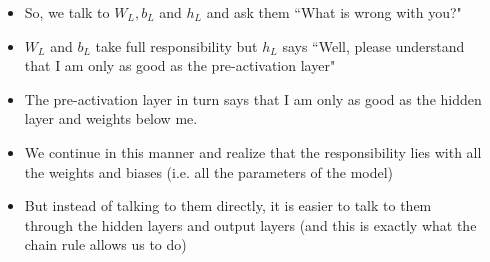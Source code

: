 \begin{frame}
  \begin{columns}
    \begin{overlayarea}{\textwidth}{\textheight}
      \footnotesize{
        \begin{itemize}
          \item So, we talk to $W_{L},b_{L}$ and $h_{L}$ and ask them ``What is wrong with you?"
          \item<2-> $W_{L}$ and $b_{L}$ take full responsibility but $h_{L}$ says ``Well, please understand that I am only as good as the pre-activation layer"
          \item<3-> The pre-activation layer in turn says that I am only as good as the hidden layer and weights below me.
          \item<4-> We continue in this manner and realize that the responsibility lies with all the weights and biases (i.e. all the parameters of the model)
          \item<5-> But instead of talking to them directly, it is easier to talk to them through the hidden layers and output layers (and this is exactly what the chain rule allows us to do)
        \end{itemize}
      }
    \end{overlayarea}

    \begin{overlayarea}{\textwidth}{\textheight}
      
    \end{overlayarea}
  \end{columns}
\end{frame}

